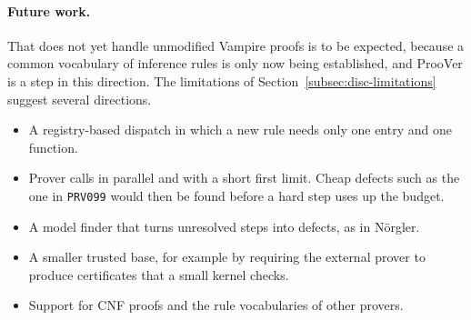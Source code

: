 \paragraph{Future work.}
That \TSTPy{} does not yet handle unmodified Vampire proofs is to be expected, because a common vocabulary of inference rules is only now being established, and ProoVer is a step in this direction.
The limitations of Section~\ref{subsec:disc-limitations} suggest several directions.
\begin{itemize}
  \item A registry-based dispatch in which a new rule needs only one entry and one function.
  \item Prover calls in parallel and with a short first limit. Cheap defects such as the one in \texttt{PRV099} would then be found before a hard step uses up the budget.
  \item A model finder that turns unresolved steps into defects, as in N\"orgler.
  \item A smaller trusted base, for example by requiring the external prover to produce certificates that a small kernel checks.
  \item Support for CNF proofs and the rule vocabularies of other provers.
\end{itemize}
